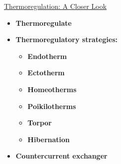 \documentclass[12pt,letterpaper]{article}
\begin{document}
\hypertarget{39.5}{}
\begin{secbox}{\hyperlink{39}{Thermoregulation: A Closer Look}}{
    \begin{itemize}
        \item \textbf{Thermoregulate}
        \item \textbf{Thermoregulatory strategies:}
        \begin{itemize}
            \item \textbf{Endotherm }
            \item \textbf{Ectotherm}
            \item \textbf{Homeotherms}
            \item \textbf{Poikilotherms}
            \item \textbf{Torpor}
            \item \textbf{Hibernation}
        \end{itemize}
        \item \textbf{Countercurrent exchanger}
    \end{itemize}
}\end{secbox}   
\end{document}
